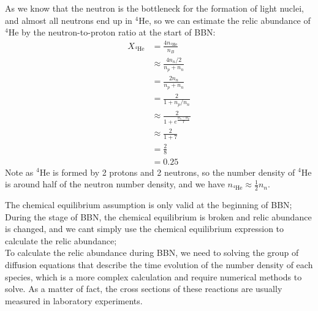 \clearpage
\begin{foundation}
    As we know that the neutron is the bottleneck for the formation of light nuclei, and almost all neutrons end up in ${}^4\text{He}$, so we can estimate the relic abundance of ${}^4\text{He}$ by the neutron-to-proton ratio at the start of BBN:
    \begin{align*}
        X_{{}^4\text{He}} &= \frac{4 n_{{}^4\text{He}}}{n_B} \\
        &\approx \frac{4 n_n / 2}{n_p + n_n} \\
        &= \frac{2 n_n}{n_p + n_n} \\
        &= \frac{2}{1 + n_p / n_n} \\
        &\approx \frac{2}{1 + e^{\frac{m_n - m_p}{T}}} \\
        &\approx \frac{2}{1 + 7} \\
        &= \frac{2}{8} \\
        &= 0.25
    \end{align*}
    Note as ${}^4\text{He}$ is formed by 2 protons and 2 neutrons, so the number density of ${}^4\text{He}$ is around half of the neutron number density, and we have $n_{{}^4\text{He}} \approx \frac{1}{2} n_n$.
\end{foundation}

\bigskip \noindent
\begin{importantnote}
   The chemical equilibrium assumption is only valid at the beginning of BBN; During the stage of BBN, the chemical equilibrium is broken and relic abundance is changed, and we cant simply use the chemical equilibrium expression to calculate the relic abundance; \\

   To calculate the relic abundance during BBN, we need to solving the group of diffusion equations that describe the time evolution of the number density of each species, which is a more complex calculation and require numerical methods to solve. As a matter of fact, the cross sections of these reactions are usually measured in laboratory experiments.
\end{importantnote}
